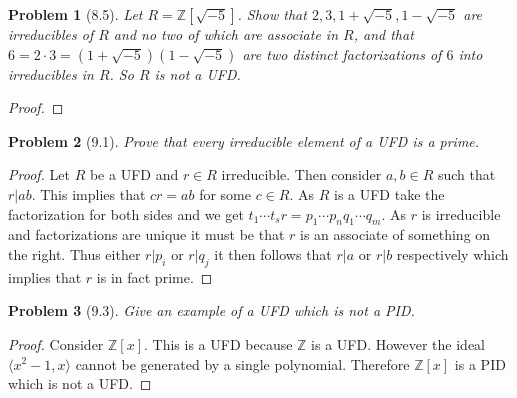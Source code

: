 \documentclass[10pt]{article}
\newcommand{\sk}{\vskip 10mm}
\newcommand{\bb}[1]{\mathbb{#1}}
\theoremstyle{plain}
\newtheorem{problem}{Problem}
\theoremstyle{remark}
\begin{document}
 \begin{problem}[8.5]
  Let $R=\bb{Z}[\sqrt{-5}]$. Show that $2,3,1+\sqrt{-5},1-\sqrt{-5}$ are
  irreducibles of $R$ and no two of which are associate in $R$, and that
  $6=2\cdot 3=(1+\sqrt{-5})(1-\sqrt{-5})$ are two distinct factorizations of
  $6$ into irreducibles in $R$. So $R$ is not a UFD.
\end{problem}

\begin{proof}
  
\end{proof}

\sk

\begin{problem}[9.1]
  Prove that every irreducible element of a UFD is a prime.
\end{problem}

\begin{proof}
  Let $R$ be a UFD and $r\in R$ irreducible. Then consider $a,b\in R$ such that
  $r|ab$. This implies that $cr=ab$ for some $c\in R$. As $R$ is a UFD take the
  factorization for both sides and we get $t_1\cdots t_sr=p_1\cdots p_nq_1\cdots q_m$.
  As $r$ is irreducible and factorizations are unique it must be that
  $r$ is an associate of something on the right. Thus either
  $r|p_i$ or $r|q_j$ it then follows that $r|a$ or $r|b$ respectively
  which implies that $r$ is in fact prime.
\end{proof}

\sk


\begin{problem}[9.3]
  Give an example of a UFD which is not a PID.
\end{problem}

\begin{proof}
  Consider $\bb{Z}[x]$. This is a UFD because $\bb{Z}$ is a UFD. However
  the ideal $\langle x^2-1,x\rangle$ cannot be generated by a single polynomial. Therefore
  $\bb{Z}[x]$ is a PID which is not a UFD.
\end{proof}

\sk
\end{document}
